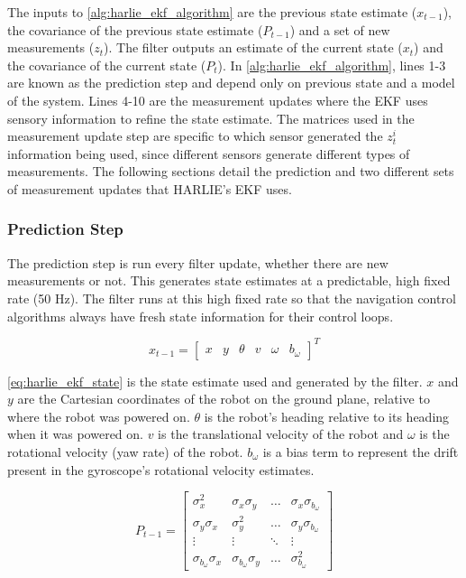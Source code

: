 The inputs to \autoref{alg:harlie_ekf_algorithm} are the previous state estimate ($x_{t-1}$), the covariance of the previous state estimate ($P_{t-1}$) and a set of new measurements ($z_t$). The filter outputs an estimate of the current state ($x_t$) and the covariance of the current state ($P_t$). In \autoref{alg:harlie_ekf_algorithm}, lines 1-3 are known as the prediction step and depend only on previous state and a model of the system. Lines 4-10 are the measurement updates where the EKF uses sensory information to refine the state estimate. The matrices used in the measurement update step are specific to which sensor generated the $z^i_t$ information being used, since different sensors generate different types of measurements. The following sections detail the prediction and two different sets of measurement updates that HARLIE's EKF uses.

\subsubsection{Prediction Step}\label{subsubsec:harlie_ekf_prediction}

The prediction step is run every filter update, whether there are new measurements or not. This generates state estimates at a predictable, high fixed rate (50 Hz). The filter runs at this high fixed rate so that the navigation control algorithms always have fresh state information for their control loops.

\begin{equation}
	x_{t-1} = 
	\begin{bmatrix}
		x &
		y &
		\theta &
		v &
		\omega &
		b_{\omega}
	\end{bmatrix}^T
	\label{eq:harlie_ekf_state}
\end{equation}

\eqref{eq:harlie_ekf_state} is the state estimate used and generated by the filter. $x$ and $y$ are the Cartesian coordinates of the robot on the ground plane, relative to where the robot was powered on. $\theta$ is the robot's heading relative to its heading when it was powered on. $v$ is the translational velocity of the robot and $\omega$ is the rotational velocity (yaw rate) of the robot. $b_{\omega}$ is a bias term to represent the drift present in the gyroscope's rotational velocity estimates.

\begin{equation}
	P_{t-1} =
	\begin{bmatrix}
		\sigma_x^2 & \sigma_x\sigma_y & \ldots & \sigma_x\sigma_{b_{\omega}} \\
		\sigma_y\sigma_x & \sigma_y^2 & \ldots & \sigma_y\sigma_{b_{\omega}} \\
		\vdots & \vdots & \ddots & \vdots \\
		\sigma_{b_{\omega}}\sigma_x & \sigma_{b_{\omega}}\sigma_y & 
			\ldots & \sigma_{b_{\omega}}^2
	\end{bmatrix}
	\label{eq:harlie_ekf_state_covariance}
\end{equation}

